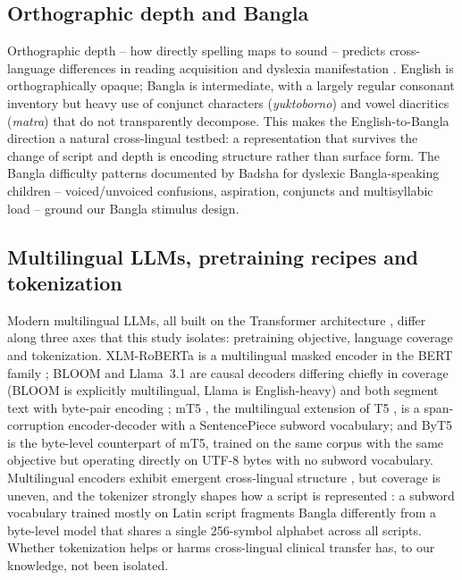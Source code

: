 \documentclass[preprint,12pt]{elsarticle}
\begin{document}
\subsection{Orthographic depth and Bangla}
Orthographic depth -- how directly spelling maps to sound -- predicts cross-language differences in reading acquisition and dyslexia manifestation \cite{ziegler2005reading}. English is orthographically opaque; Bangla is intermediate, with a largely regular consonant inventory but heavy use of conjunct characters (\textit{yuktoborno}) and vowel diacritics (\textit{matra}) that do not transparently decompose. This makes the English-to-Bangla direction a natural cross-lingual testbed: a representation that survives the change of script and depth is encoding structure rather than surface form. The Bangla difficulty patterns documented by Badsha \cite{badsha2024mall} for dyslexic Bangla-speaking children -- voiced/unvoiced confusions, aspiration, conjuncts and multisyllabic load -- ground our Bangla stimulus design.

\subsection{Multilingual LLMs, pretraining recipes and tokenization}
Modern multilingual LLMs, all built on the Transformer architecture \cite{vaswani2017attention}, differ along three axes that this study isolates: pretraining objective, language coverage and tokenization. XLM-RoBERTa \cite{conneau2020xlmr} is a multilingual masked encoder in the BERT family \cite{devlin2019bert}; BLOOM \cite{scao2022bloom} and Llama~3.1 \cite{dubey2024llama3} are causal decoders differing chiefly in coverage (BLOOM is explicitly multilingual, Llama is English-heavy) and both segment text with byte-pair encoding \cite{sennrich2016bpe}; mT5 \cite{xue2021mt5}, the multilingual extension of T5 \cite{raffel2020t5}, is a span-corruption encoder-decoder with a SentencePiece \cite{kudo2018sentencepiece} subword vocabulary; and ByT5 \cite{xue2022byt5} is the byte-level counterpart of mT5, trained on the same corpus with the same objective but operating directly on UTF-8 bytes with no subword vocabulary. Multilingual encoders exhibit emergent cross-lingual structure \cite{pires2019mbert,wu2020emerging,artetxe2020cross}, but coverage is uneven, and the tokenizer strongly shapes how a script is represented \cite{rust2021tokenizer}: a subword vocabulary trained mostly on Latin script fragments Bangla differently from a byte-level model that shares a single 256-symbol alphabet across all scripts. Whether tokenization helps or harms cross-lingual clinical transfer has, to our knowledge, not been isolated.
\end{document}
